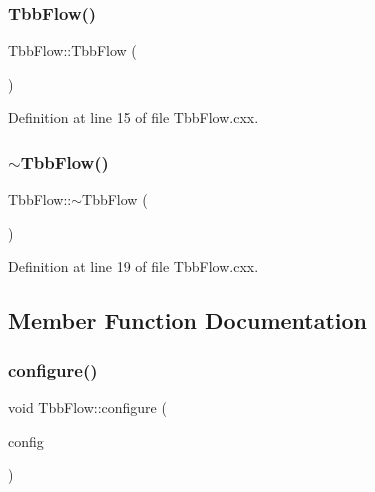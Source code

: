 \subsubsection{\texorpdfstring{Tbb\+Flow()}{TbbFlow()}}
{\footnotesize\ttfamily Tbb\+Flow\+::\+Tbb\+Flow (\begin{DoxyParamCaption}{ }\end{DoxyParamCaption})}



Definition at line 15 of file Tbb\+Flow.\+cxx.

\mbox{\label{class_wire_cell_tbb_1_1_tbb_flow_a8087921efab90664efa8c730b90af5ac}} 
\subsubsection{\texorpdfstring{$\sim$\+Tbb\+Flow()}{~TbbFlow()}}
{\footnotesize\ttfamily Tbb\+Flow\+::$\sim$\+Tbb\+Flow (\begin{DoxyParamCaption}{ }\end{DoxyParamCaption})\hspace{0.3cm}{\ttfamily [virtual]}}



Definition at line 19 of file Tbb\+Flow.\+cxx.



\subsection{Member Function Documentation}
\mbox{\label{class_wire_cell_tbb_1_1_tbb_flow_aad4ef0b553f5efdbe2558fad84373ab9}} 
\subsubsection{\texorpdfstring{configure()}{configure()}}
{\footnotesize\ttfamily void Tbb\+Flow\+::configure (\begin{DoxyParamCaption}\item[{const \hyperlink{namespace_wire_cell_a9f705541fc1d46c608b3d32c182333ee}{Wire\+Cell\+::\+Configuration} \&}]{config }\end{DoxyParamCaption})\hspace{0.3cm}{\ttfamily [virtual]}}



